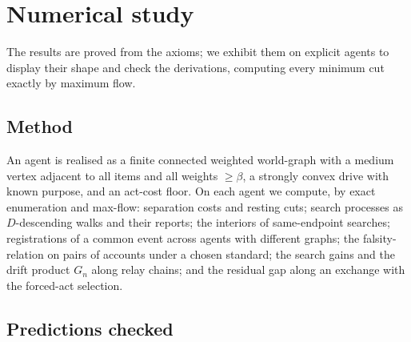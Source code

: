 \documentclass[11pt,twocolumn,a4paper]{article}
\newcommand{\flo}{\beta}
\newcommand{\dem}{D}
\begin{document}
\section{Numerical study}
\label{sec:validation}

The results are proved from the axioms; we exhibit them on explicit agents
to display their shape and check the derivations, computing every minimum cut
exactly by maximum flow.

\subsection{Method}

An agent is realised as a finite connected weighted world-graph with a
medium vertex adjacent to all items and all weights $\ge\flo$, a strongly
convex drive with known purpose, and an act-cost floor. On each agent we
compute, by exact enumeration and max-flow: separation costs and resting
cuts; search processes as $\dem$-descending walks and their reports; the
interiors of same-endpoint searches; registrations of a common event across
agents with different graphs; the falsity-relation on pairs of accounts under
a chosen standard; the search gains and the drift product $G_n$ along relay
chains; and the residual gap along an exchange with the forced-act selection.

\subsection{Predictions checked}
\end{document}
